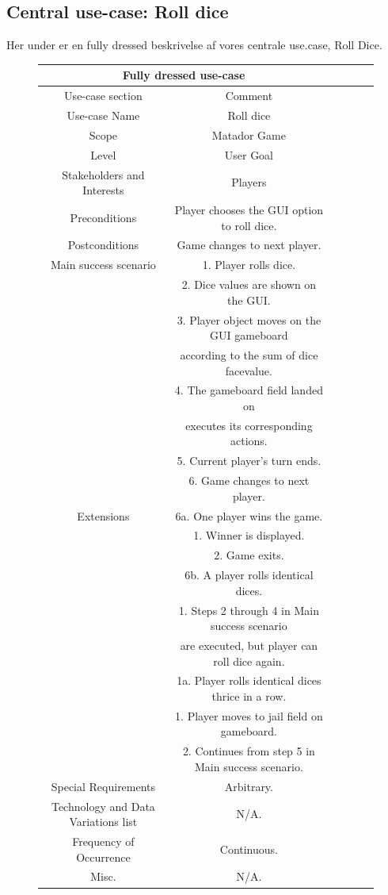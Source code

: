 \begin{flushleft}
\subsection{Central use-case: Roll dice}
Her under er en fully dressed beskrivelse af vores centrale use.case, Roll Dice. \\
\begin{figure}[htp]
    \centering
\begin{tabular}{ |c|c|c|c|c|c|  }
\hline
\multicolumn{2}{|c|}{Fully dressed use-case} \\
\hline
Use-case section & Comment \\
\hline
Use-case Name & Roll dice\\
\hline
Scope & Matador Game\\
\hline
Level & User Goal\\
\hline
Stakeholders and Interests & Players\\
\hline
Preconditions & Player chooses the GUI option to roll dice.\\
\hline
Postconditions & Game changes to next player.\\
\hline
Main success scenario & 1. Player rolls dice.\\
                      & 2. Dice values are shown on the GUI.\\
                    & 3. Player object moves on the GUI gameboard\\
                    & according to the sum of dice facevalue.\\
                    & 4. The gameboard field landed on \\
                    & executes its corresponding actions.\\
                    & 5. Current player's turn ends.\\
                    & 6. Game changes to next player.\\
\hline
Extensions & 6a. One player wins the game. \\
                   & 1. Winner is displayed.\\
                   & 2. Game exits.       \\
                   & 6b. A player rolls identical dices. \\
                   & 1. Steps 2 through 4 in Main success scenario\\
                   & are executed, but player can roll dice again. \\
                   & 1a. Player rolls identical dices thrice in a row.\\
                   & 1. Player moves to jail field on gameboard. \\
                   & 2. Continues from step 5 in Main success scenario.\\
\hline
Special Requirements & Arbitrary.\\
\hline
Technology and Data Variations list & N/A.\\
\hline
Frequency of Occurrence & Continuous.\\
\hline
Misc. & N/A.\\
\hline


\end{tabular}
\end{figure}
\end{flushleft}
